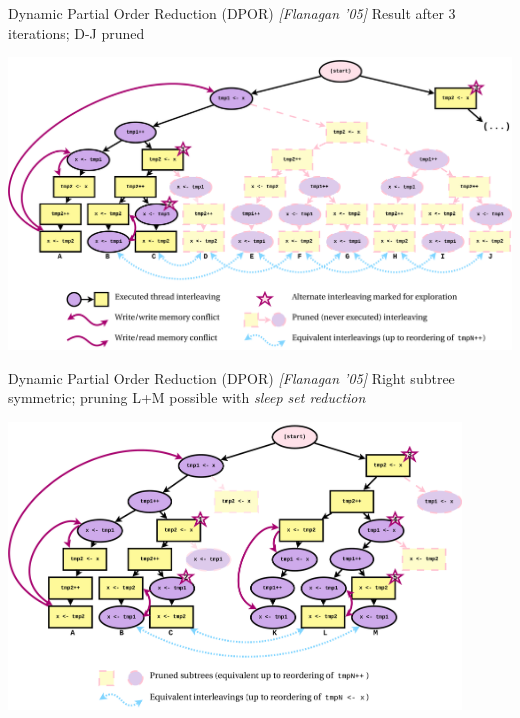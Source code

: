 \documentclass[xcolor=dvipsnames]{beamer}
\begin{document}
\begin{frame}{Dynamic Partial Order Reduction (DPOR) {\em [Flanagan '05]}}
	Result after 3 iterations; D-J pruned
	\begin{center}
		\includegraphics[width=\textwidth]{../dpor-example-1.pdf}
	\end{center}
\end{frame}
\begin{frame}{Dynamic Partial Order Reduction (DPOR) {\em [Flanagan '05]}}
	Right subtree symmetric; pruning L+M possible with {\em sleep set reduction}
	\begin{center}
		\includegraphics[width=0.9\textwidth]{../dpor-example-2.pdf}
	\end{center}
\end{frame}
\end{document}

